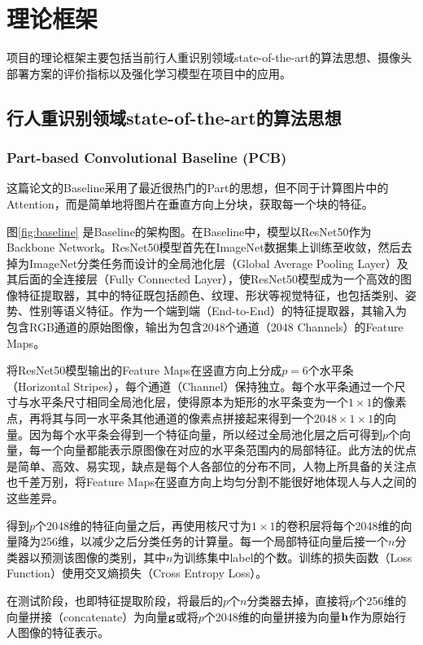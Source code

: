 \section{理论框架}
项目的理论框架主要包括当前行人重识别领域state-of-the-art的算法思想、摄像头部署方案的评价指标以及强化学习模型在项目中的应用。

\subsection{行人重识别领域state-of-the-art的算法思想}

\subsubsection{Part-based Convolutional Baseline (PCB)}
这篇论文的Baseline采用了最近很热门的Part的思想，但不同于计算图片中的Attention，而是简单地将图片在垂直方向上分块，获取每一个块的特征。

图\ref{fig:baseline} 是Baseline的架构图。在Baseline中，模型以ResNet50作为Backbone Network。ResNet50模型首先在ImageNet数据集上训练至收敛，然后去掉为ImageNet分类任务而设计的全局池化层（Global Average Pooling Layer）及其后面的全连接层（Fully Connected Layer），使ResNet50模型成为一个高效的图像特征提取器，其中的特征既包括颜色、纹理、形状等视觉特征，也包括类别、姿势、性别等语义特征。作为一个端到端（End-to-End）的特征提取器，其输入为包含RGB通道的原始图像，输出为包含2048个通道（2048 Channels）的Feature Maps。

将ResNet50模型输出的Feature Maps在竖直方向上分成$p=6$个水平条（Horizontal Stripes），每个通道（Channel）保持独立。每个水平条通过一个尺寸与水平条尺寸相同全局池化层，使得原本为矩形的水平条变为一个$1\times1$的像素点，再将其与同一水平条其他通道的像素点拼接起来得到一个$2048\times1\times1$的向量。因为每个水平条会得到一个特征向量，所以经过全局池化层之后可得到$p$个向量，每一个向量都能表示原图像在对应的水平条范围内的局部特征。此方法的优点是简单、高效、易实现，缺点是每个人各部位的分布不同，人物上所具备的关注点也千差万别，将Feature Maps在竖直方向上均匀分割不能很好地体现人与人之间的这些差异。

得到$p$个2048维的特征向量之后，再使用核尺寸为$1\times1$的卷积层将每个2048维的向量降为256维，以减少之后分类任务的计算量。每一个局部特征向量后接一个$n$分类器以预测该图像的类别，其中$n$为训练集中label的个数。训练的损失函数（Loss Function）使用交叉熵损失（Cross Entropy Loss）。

在测试阶段，也即特征提取阶段，将最后的$p$个$n$分类器去掉，直接将$p$个256维的向量拼接（concatenate）为向量$\textbf g$或将$p$个2048维的向量拼接为向量$\textbf h$作为原始行人图像的特征表示。

